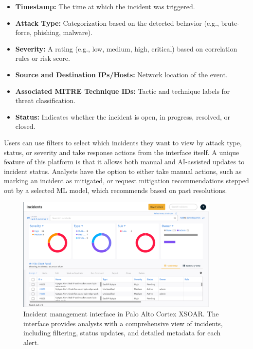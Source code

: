 \begin{itemize}[noitemsep,topsep=0pt]
    \item \textbf{Timestamp:} The time at which the incident was triggered.
    \item \textbf{Attack Type:} Categorization based on the detected behavior (e.g., brute-force, phishing, malware).
    \item \textbf{Severity:} A rating (e.g., low, medium, high, critical) based on correlation rules or risk score.
    \item \textbf{Source and Destination IPs/Hosts:} Network location of the event.
    \item \textbf{Associated MITRE Technique IDs:} Tactic and technique labels for threat classification.
    \item \textbf{Status:} Indicates whether the incident is open, in progress, resolved, or closed.
\end{itemize}

Users can use filters to select which incidents they want to view by attack type, status, or severity and take response actions from the interface itself. A unique feature of this platform is that it allows both manual and AI-assisted updates to incident status. Analysts have the option to either take manual actions, such as marking an incident as mitigated, or request mitigation recommendations stepped out by a selected ML model, which recommends based on past resolutions. 

\begin{figure}[ht]
    \centering
    \includegraphics[width=0.9\textwidth]{images/xsoar_incidents.png}
    \caption[Incident management interface in Palo Alto Cortex XSOAR]{Incident management interface in Palo Alto Cortex XSOAR. The interface provides analysts with a comprehensive view of incidents, including filtering, status updates, and detailed metadata for each alert.}
    \label{fig:xsoar-incidents}
\end{figure}

